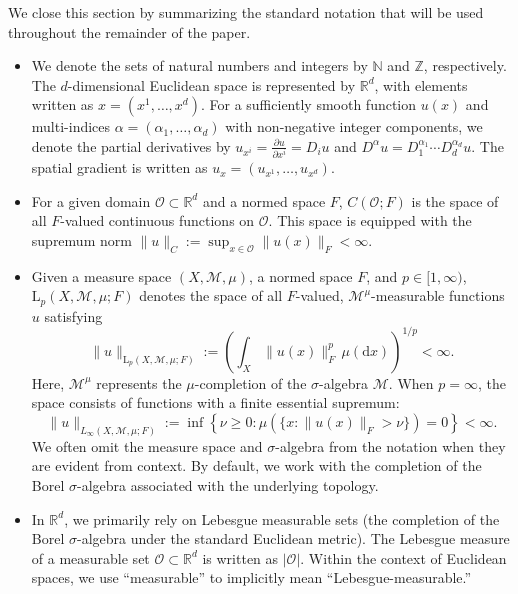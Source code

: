 \documentclass[11pt,reqno]{amsart}
\theoremstyle{definition}
\theoremstyle{remark}
\numberwithin{equation}{section}
\begin{document}
\vspace{2mm}
We close this section by summarizing the standard notation that will be used throughout the remainder of the paper.

\begin{itemize}
\item We denote the sets of natural numbers and integers by $\mathbb{N}$ and $\mathbb{Z}$, respectively. 
The $d$-dimensional Euclidean space is represented by $\mathbb{R}^d$, with elements written as $x = (x^1, \ldots, x^d)$. 
For a sufficiently smooth function $u(x)$ and multi-indices $\alpha = (\alpha_1, \ldots, \alpha_d)$ with non-negative integer components, we denote the partial derivatives by $u_{x^i} = \frac{\partial u}{\partial x^i} = D_i u$ and $D^\alpha u = D_1^{\alpha_1} \cdots D_d^{\alpha_d} u$. 
The spatial gradient is written as $u_x = (u_{x^1}, \ldots, u_{x^d})$.

\item For a given domain $\mathcal{O} \subset \mathbb{R}^d$ and a normed space $F$, $C(\mathcal{O}; F)$ is the space of all $F$-valued continuous functions on $\mathcal{O}$. 
This space is equipped with the supremum norm $\|u\|_{C} := \sup_{x \in \mathcal{O}} \|u(x)\|_F < \infty$.

\item Given a measure space $(X, \mathcal{M}, \mu)$, a normed space $F$, and $p \in [1, \infty)$, $\mathrm{L}_p(X, \mathcal{M}, \mu; F)$ denotes the space of all $F$-valued, $\mathcal{M}^\mu$-measurable functions $u$ satisfying
$$
\|u\|_{\mathrm{L}_p(X, \mathcal{M}, \mu; F)} := \left( \int_X \|u(x)\|_F^p \, \mu(\mathrm{d}x) \right)^{1/p} < \infty.
$$
Here, $\mathcal{M}^\mu$ represents the $\mu$-completion of the $\sigma$-algebra $\mathcal{M}$. 
When $p = \infty$, the space consists of functions with a finite essential supremum:
$$
\|u\|_{L_\infty(X, \mathcal{M}, \mu; F)} := \inf \left\{ \nu \geq 0 : \mu(\{ x : \|u(x)\|_F > \nu \}) = 0 \right\} < \infty.
$$
We often omit the measure space and $\sigma$-algebra from the notation when they are evident from context. 
By default, we work with the completion of the Borel $\sigma$-algebra associated with the underlying topology.

\item In $\mathbb{R}^d$, we primarily rely on Lebesgue measurable sets (the completion of the Borel $\sigma$-algebra under the standard Euclidean metric). The Lebesgue measure of a measurable set $\mathcal{O} \subset \mathbb{R}^d$ is written as $|\mathcal{O}|$. Within the context of Euclidean spaces, we use ``measurable'' to implicitly mean ``Lebesgue-measurable.''


\end{itemize}
\end{document}
